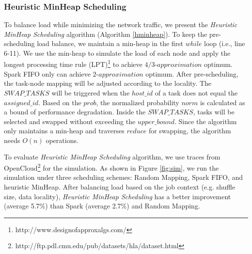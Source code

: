 \subsubsection{Heuristic MinHeap Scheduling}\label{h-minheap}
To balance load while minimizing the network traffic, we present the \textit{Heuristic MinHeap Scheduling} algorithm (Algorithm \ref{hminheap}).
{\color{black}
To keep the pre-scheduling load balance, we maintain a min-heap in the first $while$ loop (i.e., line 6-11).
We use the min-heap to simulate the load of each node and apply the longest processing time rule (LPT)\footnote{http://www.designofapproxalgs.com/} to achieve $4/3\text{-}approximation$ optimum.
Spark FIFO only can achieve $2\text{-}approximation$ optimum.
}
After pre-scheduling, the task-node mapping will be adjusted according to the locality. 
The $SWAP\_TASKS$ will be triggered when the $host\_id$ of a task does not equal the $assigned\_id$.
Based on the $prob$, the normalized probability $norm$ is calculated as a bound of performance degradation. 
Inside the $SWAP\_TASKS$, tasks will be selected and swapped without exceeding the $upper\_bound$.
Since the algorithm only maintains a min-heap and traverses $reduce$ for swapping, the algorithm needs $O(n)$ operations. 

{\color{black}
To evaluate \textit{Heuristic MinHeap Scheduling} algorithm, we use traces from OpenCloud\footnote{\label{fn:trace}http://ftp.pdl.cmu.edu/pub/datasets/hla/dataset.html} for the simulation.
As shown in Figure \ref{fig:sim}, we run the simulation under three scheduling schemes: Random Mapping, Spark FIFO, and heuristic MinHeap.
After balancing load based on the job context (e.g. shuffle size, data locality), \textit{Heuristic MinHeap Scheduling} has a better improvement (average 5.7\%) than Spark (average 2.7\%) and Random Mapping.
}

